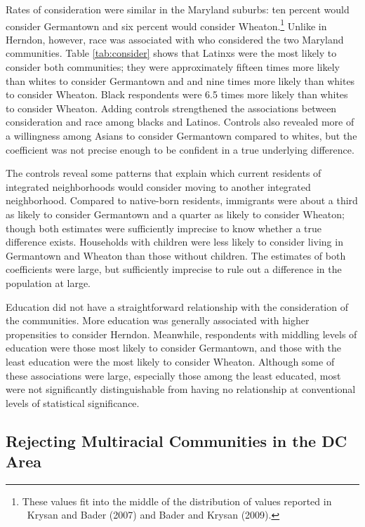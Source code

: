\documentclass{baderart}
\newcommand{\TK}[1][]{\strong{TK #1}}
\begin{document}
Rates of consideration were similar in the Maryland suburbs: ten percent would consider Germantown and six percent would consider Wheaton.\footnote{These values fit into the middle of the distribution of values reported in \TK\ Krysan and Bader (2007) and Bader and Krysan (2009).} Unlike in Herndon, however, race was associated with who considered the two Maryland communities. Table \ref{tab:consider} shows that Latinxs were the most likely to consider both communities; they were approximately fifteen times more likely than whites to consider Germantown and and nine times more likely than whites to consider Wheaton. Black respondents were 6.5 times more likely than whites to consider Wheaton. Adding controls strengthened the associations between consideration and race among blacks and Latinos. Controls also revealed more of a willingness among Asians to consider Germantown compared to whites, but the coefficient was not precise enough to be confident in a true underlying difference. 

The controls reveal some patterns that explain which current residents of integrated neighborhoods would consider moving to another integrated neighborhood. Compared to native-born residents, immigrants were about a third as likely to consider Germantown and a quarter as likely to consider Wheaton; though both estimates were sufficiently imprecise to know whether a true difference exists. Households with children were less likely to consider living in Germantown and Wheaton than those without children. The estimates of both coefficients were large, but sufficiently imprecise to rule out a difference in the population at large. 

Education did not have a straightforward relationship with the consideration of the communities. More education was generally associated with higher propensities to consider Herndon. Meanwhile, respondents with middling levels of education were those most likely to consider Germantown, and those with the least education were the most likely to consider Wheaton. Although some of these associations were large, especially those among the least educated, most were not significantly distinguishable from having no relationship at conventional levels of statistical significance. 

\subsection{Rejecting Multiracial Communities in the DC Area}\label{ssec:reject}
\end{document}
